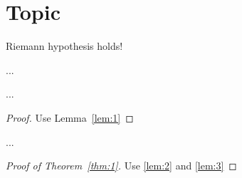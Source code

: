 \def\filepath{C:/Users/Owner/Dropbox/Math/templates}





%


%

\pagestyle{fancy}
\chead{} 
\lfoot{} 
\cfoot{\thepage} 
\rfoot{} 
\renewcommand{\headrulewidth}{.3pt} 
\setlength\voffset{0in}
\setlength\textheight{648pt}


\section{Topic}

\begin{thm}
Riemann hypothesis holds!
\label{thm:1}
\end{thm}

\begin{lem}
...\label{lem:1}
\end{lem}

\begin{lem}\label{lem:2}
...
\end{lem}
\begin{proof}
Use Lemma~\ref{lem:1}
\end{proof}

\begin{lem}
...\label{lem:3}
\end{lem}

\begin{proof}[Proof of Theorem~\ref{thm:1}]
Use \ref{lem:2} and \ref{lem:3}
\end{proof}


%
 
%
%
